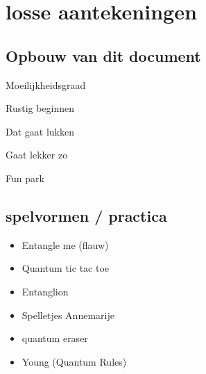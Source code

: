\documentclass[../../main.tex]{subfiles}
\begin{document}
\onlyinsubfile{\setcounter{chapter}{8}}
\notinsubfile{}
\chapter{losse aantekeningen}

\section{Opbouw van dit document}

Moeilijkheidsgraad

\easy  Rustig beginnen

\normal Dat gaat lukken

\diff Gaat lekker zo

\fun Fun park




\section{spelvormen / practica}
\begin{itemize}
\item Entangle me (flauw)
\item Quantum tic tac toe
\item Entanglion
\item Spelletjes Annemarije
\item quantum eraser
\item Young (Quantum Rules)
\end{itemize}
\end{document}
